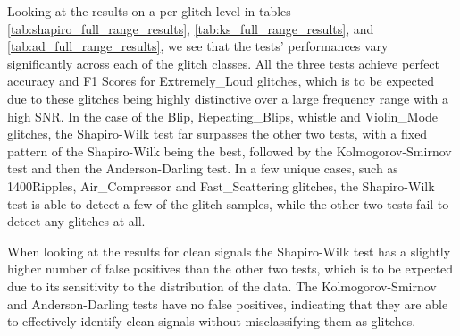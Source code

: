 \documentclass[12pt]{article}
\begin{document}
\noindent Looking at the results on a per-glitch level in tables \ref{tab:shapiro_full_range_results}, \ref{tab:ks_full_range_results}, and \ref{tab:ad_full_range_results}, we see that the tests' performances vary significantly across each of the glitch classes. All the three tests achieve perfect accuracy and F1 Scores for Extremely\_Loud glitches, which is to be expected due to these glitches being highly distinctive over a large frequency range with a high SNR. In the case of the Blip, Repeating\_Blips, whistle and Violin\_Mode glitches, the Shapiro-Wilk test far surpasses the other two tests, with a fixed pattern of the Shapiro-Wilk being the best, followed by the Kolmogorov-Smirnov test and then the Anderson-Darling test. In a few unique cases, such as 1400Ripples, Air\_Compressor and Fast\_Scattering glitches, the Shapiro-Wilk test is able to detect a few of the glitch samples, while the other two tests fail to detect any glitches at all.

\medskip
\noindent When looking at the results for clean signals the Shapiro-Wilk test has a slightly higher number of false positives than the other two tests, which is to be expected due to its sensitivity to the distribution of the data. The Kolmogorov-Smirnov and Anderson-Darling tests have no false positives, indicating that they are able to effectively identify clean signals without misclassifying them as glitches.

\end{document}
